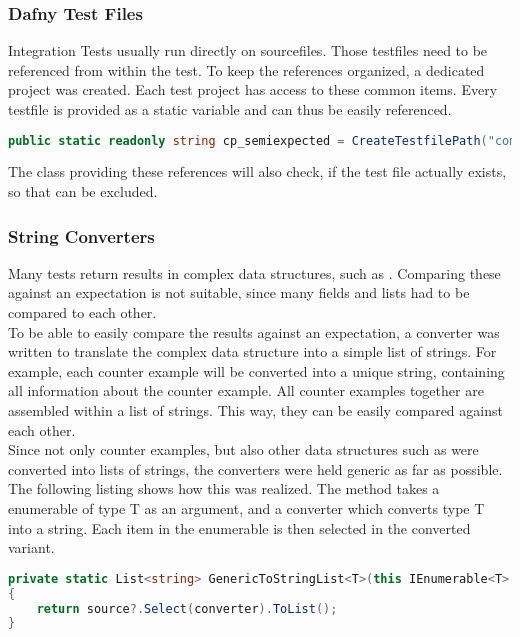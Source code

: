 \subsubsection{Dafny Test Files}
Integration Tests usually run directly on  sourcefiles. Those testfiles need to be referenced from within the test. To keep the references organized, a dedicated project  was created. Each test project has access to these common items. Every testfile is provided as a static variable and can thus be easily referenced.

\begin{lstlisting}[language=csharp, caption={Test File Reference}, captionpos=b, label={lst:semiExpectedCodeThing}]
public static readonly string cp_semiexpected = CreateTestfilePath("compile/semi_expected_error.dfy");
\end{lstlisting}
The class providing these references will also check, if the test file actually exists, so that  can be excluded.

\subsubsection{String Converters}
Many tests return results in complex data structures, such as . Comparing these against an expectation is not suitable, since many fields and lists had to be compared to each other.\\
To be able to easily compare the results against an expectation, a converter was written to translate the complex data structure into a simple list of strings. For example, each counter example will be converted into a unique string, containing all information about the counter example. All counter examples together are assembled within a list of strings. This way, they can be easily compared against each other.\\
Since not only counter examples, but also other data structures such as  were converted into lists of strings, the converters were held generic as far as possible. The following listing shows how this was realized. The method takes a enumerable of type T as an argument, and a converter which converts type T into a string. Each item in the enumerable is then selected in the converted variant.

\begin{lstlisting}[language=csharp, caption={Generic Method to Convert an IEnumerable}, captionpos=b, label={lst:genericconverter}]
private static List<string> GenericToStringList<T>(this IEnumerable<T> source, Func<T, string> converter)
{
    return source?.Select(converter).ToList();
}
\end{lstlisting}

